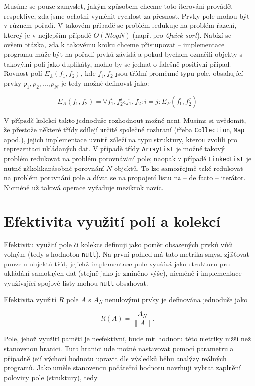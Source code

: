 Musíme se pouze zamyslet, jakým způsobem chceme toto iterování provádět -- respektive, zda jsme ochotni vyměnit rychlost za přesnost. Prvky pole mohou být v různém pořadí. V takovém případě se problém redukuje na problém řazení, ktereý je v nejlepším případě $O(N logN)$ (např. pro \textit{Quick sort}). Nabízí se ovšem otázka, zda k takovému kroku chceme přistupovat -- implementace programu může být na pořadí prvků závislá a pokud bychom označili objekty s takovými poli jako duplikáty, mohlo by se jednat o falešně positivní případ. Rovnost polí $E_A(f_1, f_2)$, kde $f_1, f_2$ jsou třídní proměnné typu pole, obsahující prvky $p_1, p_2, ..., p_N$ je tedy možné definovat jako:

\begin{equation}
E_A(f_1, f_2)=\forall f_1^i, f_2^j \epsilon f_1, f_2: i = j : E_F(f_1^i, f_2^j)
\end{equation}

V případě kolekcí takto jednoduše rozhodnout možné není. Musíme si uvědomit, že přestože některé třídy sdílejí určité společné rozhraní (třeba \texttt{Collection}, \texttt{Map} apod.), jejich implementace uvnitř záleží na typu struktury, kterou zvolili pro reprezentaci ukládaných dat. V případě třídy \texttt{ArrayList} je možné takový problém redukovat na problém porovnávání pole; naopak v případě \texttt{LinkedList} je nutné několikanásobné porovnání $N$ objektů. To lze samozřejmě také redukovat na problém porovnání pole a dívat se na propojení listu na -- de facto -- iterátor. Nicméně už taková operace vyžaduje mezikrok navíc.

\section{Efektivita využití polí a kolekcí}
Efektivitu využití pole či kolekce definuji jako poměr obsazených prvků vůči volným (tedy s hodnotou \texttt{null}). Na první pohled má tato metrika smysl zjišťovat pouze u objektů tříd, jejichž implementace pole využívá jako strukturu pro ukládání samotných dat (stejně jako je zmíněno výše), nicméně i implementace využívající spojové listy mohou \texttt{null} obsahovat.

Efektivita využití $R$ pole $A$ s $A_N$ nenulovými prvky je definována jednoduše jako

\begin{equation}
    R(A) = \frac{A_N}{\|A\|}.
\end{equation}

Pole, jehož využití paměti je neefektivní, bude mít hodnotu této metriky nižší než stanovenou hranici. Tuto hranici ude možné nastavovat pomocí parametru a případně její výchozí hodnotu upravit dle výsledků běhu analýzy reálných programů. Jako uměle stanovenou počáteční hodnotu navrhuji vybrat zaplnění poloviny pole (struktury), tedy

